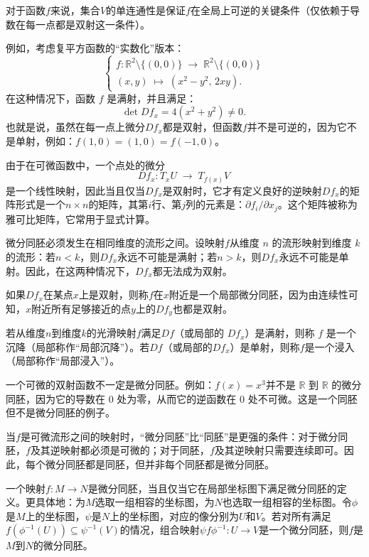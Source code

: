 对于函数$f$来说，集合$V$的单连通性是保证$f$在全局上可逆的关键条件（仅依赖于导数在每一点都是双射这一条件）。

例如，考虑复平方函数的“实数化”版本：
  $$
  \begin{cases}
  f:\mathbb{R}^2 \setminus \{(0,0)\} \;\to\; \mathbb{R}^2 \setminus \{(0,0)\}\\
  (x,y) \;\mapsto\; (x^2 - y^2,\, 2xy).
  \end{cases}~
  $$
在这种情况下，函数 $f$ 是满射，并且满足：
  $$
  \det Df_x = 4(x^2 + y^2) \neq 0.~
  $$
也就是说，虽然在每一点上微分$Df_x$都是双射，但函数$f$并不是可逆的，因为它不是单射，例如：$f(1,0) = (1,0) = f(-1,0)$。

由于在可微函数中，一个点处的微分
  $$
  Df_x: T_xU \;\to\; T_{f(x)}V~
  $$
是一个线性映射，因此当且仅当$Df_x$是双射时，它才有定义良好的逆映射$Df_x$的矩阵形式是一个$n \times n$的矩阵，其第$i$行、第$j$列的元素是：$\partial f_i/\partial x_j$。这个矩阵被称为雅可比矩阵，它常用于显式计算。

微分同胚必须发生在相同维度的流形之间。设映射$f$从维度 $n$ 的流形映射到维度 $k$ 的流形：若$n < k$，则$Df_x$永远不可能是满射；若$n > k$，则$Df_x$永远不可能是单射。因此，在这两种情况下，$Df_x$都无法成为双射。

如果$Df_x$在某点$x$上是双射，则称$f$在$x$附近是一个局部微分同胚，因为由连续性可知，$x$附近所有足够接近的点$y$上的$Df_y$也都是双射。

若从维度$n$到维度$k$的光滑映射$f$满足$Df$（或局部的 $Df_x$）是满射，则称 $f$ 是一个沉降（局部称作“局部沉降”）。若$Df$（或局部的$Df_x$）是单射，则称$f$是一个浸入（局部称作“局部浸入”）。

一个可微的双射函数不一定是微分同胚。例如：$f(x) = x^3$并不是 $\mathbb{R}$ 到 $\mathbb{R}$ 的微分同胚，因为它的导数在 $0$ 处为零，从而它的逆函数在 $0$ 处不可微。这是一个同胚但不是微分同胚的例子。

当$f$是可微流形之间的映射时，“微分同胚”比“同胚”是更强的条件：对于微分同胚，$f$及其逆映射都必须是可微的；对于同胚，$f$及其逆映射只需要连续即可。因此，每个微分同胚都是同胚，但并非每个同胚都是微分同胚。

一个映射$f: M \to N$是微分同胚，当且仅当它在局部坐标图下满足微分同胚的定义。更具体地：为$M$选取一组相容的坐标图，为$N$也选取一组相容的坐标图。令$\phi$ 是$M$上的坐标图，$\psi$是$N$上的坐标图，对应的像分别为$U$和$V$。若对所有满足$f(\phi^{-1}(U)) \subseteq \psi^{-1}(V)$的情况，组合映射$\psi f \phi^{-1}: U \to V$是一个微分同胚，则$f$是$M$到$N$的微分同胚。
